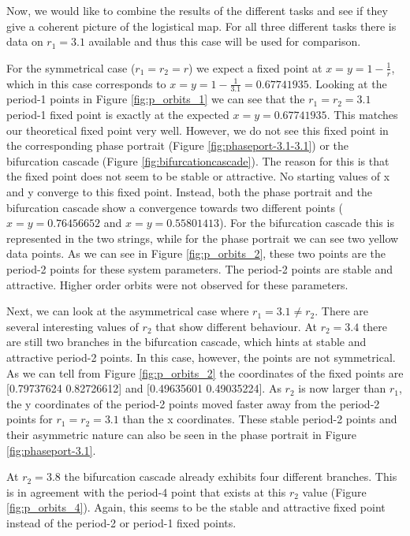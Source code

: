 Now, we would like to combine the results of the different tasks and see if they give a coherent picture of the logistical map. 
For all three different tasks there is data on $r_1=3.1$ available and thus this case will be used for comparison.

For the symmetrical case ($r_1 = r_2 = r$) we expect a fixed point at $x = y = 1 - \frac{1}{r}$, which in this case corresponds to 
$x = y = 1 - \frac{1}{3.1} = 0.67741935 $. Looking at the period-1 points in Figure \ref{fig:p_orbits_1} we can see that the $r_1 = r_2 = 3.1$ period-1 fixed point is exactly at the 
expected $x = y = 0.67741935$. This matches our theoretical fixed point very well. However, we do not see this fixed point in the corresponding phase portrait (Figure \ref{fig:phaseport-3.1-3.1}) or 
the bifurcation cascade (Figure \ref{fig:bifurcationcascade}). The reason for this is that the fixed point does not seem to be stable or attractive. No starting values of x and y converge to this fixed point. 
Instead, both the phase portrait and the bifurcation cascade show a convergence towards two different points ($x = y = 0.76456652$ and $x=y=0.55801413$). For the bifurcation 
cascade this is represented in the two strings, while for the phase portrait we can see two yellow data points. As we can see in Figure \ref{fig:p_orbits_2}, these two points are the 
period-2 points for these system parameters. The period-2 points are stable and attractive. Higher order orbits were not observed for these parameters.

Next, we can look at the asymmetrical case where $r_1 = 3.1 \ne r_2$. There are several interesting values of $r_2$ that show different behaviour. At $r_2 =3.4$ there are 
still two branches in the bifurcation cascade, which hints at stable and attractive period-2 points. In this case, however, the points are not symmetrical. As we can tell from 
Figure \ref{fig:p_orbits_2} the coordinates of the fixed points are [0.79737624 0.82726612] and [0.49635601 0.49035224]. As $r_2$ is now larger than $r_1$, the y coordinates of the period-2 points moved 
faster away from the period-2 points for $r_1 = r_2 = 3.1 $ than the x coordinates. These stable period-2 points and their asymmetric nature can also be seen in the phase portrait in Figure 
\ref{fig:phaseport-3.1}.

At $r_2=3.8$ the bifurcation cascade already exhibits four different branches. This is in agreement with the period-4 point that exists at this $r_2$ value (Figure \ref{fig:p_orbits_4}). Again, this seems 
to be the stable and attractive fixed point instead of the period-2 or period-1 fixed points.

